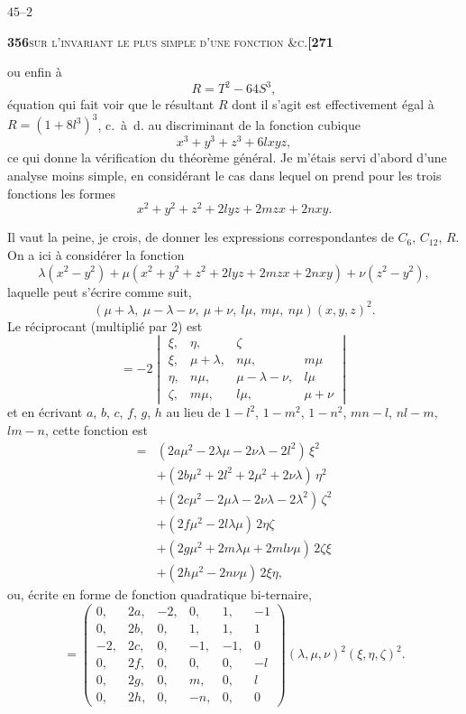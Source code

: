 \documentclass[11pt]{article}
\begin{document}
\hfill $45$--$2$

\newpage
\noindent\textbf{356}\hfill\textsc{sur l'invariant le plus simple d'une fonction \&c.}\hfill\textbf{[271}

\medskip

\noindent ou enfin \`a
\[
R = T^2 - 64 S^3,
\]
\'equation qui fait voir que le r\'esultant $R$ dont il s'agit est effectivement \'egal \`a $R = (1 + 8 l^3)^3$, c.~\`a~d. au discriminant de la fonction cubique
\[
x^3 + y^3 + z^3 + 6 l x y z,
\]
ce qui donne la v\'erification du th\'eor\`eme g\'en\'eral. Je m'\'etais servi d'abord d'une analyse moins simple, en consid\'erant le cas dans lequel on prend pour les trois fonctions les formes
\[
x^2 + y^2 + z^2 + 2 l y z + 2 m z x + 2 n x y.
\]

Il vaut la peine, je crois, de donner les expressions correspondantes de $C_6$, $C_{12}$, $R$. On a ici \`a consid\'erer la fonction
\[
\lambda(x^2 - y^2) + \mu(x^2 + y^2 + z^2 + 2 l y z + 2 m z x + 2 n x y) + \nu(z^2 - y^2),
\]
laquelle peut s'\'ecrire comme suit,
\[
(\mu + \lambda,\ \mu - \lambda - \nu,\ \mu + \nu,\ l\mu,\ m\mu,\ n\mu)(x, y, z)^2.
\]
Le r\'eciprocant (multipli\'e par 2) est
\[
= -2 \begin{vmatrix}
\xi, & \eta, & \zeta \\
\xi, & \mu+\lambda, & n\mu, & m\mu \\
\eta, & n\mu, & \mu-\lambda-\nu, & l\mu \\
\zeta, & m\mu, & l\mu, & \mu+\nu
\end{vmatrix}
\]
et en \'ecrivant $a$, $b$, $c$, $f$, $g$, $h$ au lieu de $1 - l^2$, $1 - m^2$, $1 - n^2$, $mn - l$, $nl - m$, $lm - n$, cette fonction est
\[
\begin{aligned}
= {}& (2 a \mu^2 - 2 \lambda \mu - 2 \nu \lambda - 2 l^2)\, \xi^2 \\
& + (2 b \mu^2 + 2 l^2 + 2 \mu^2 + 2 \nu \lambda)\, \eta^2 \\
& + (2 c \mu^2 - 2 \mu \lambda - 2 \nu \lambda - 2 \lambda^2)\, \zeta^2 \\
& + (2 f \mu^2 - 2 l \lambda \mu)\, 2 \eta \zeta \\
& + (2 g \mu^2 + 2 m \lambda \mu + 2 m l \nu \mu)\, 2 \zeta \xi \\
& + (2 h \mu^2 - 2 n \nu \mu)\, 2 \xi \eta,
\end{aligned}
\]
ou, \'ecrite en forme de fonction quadratique bi-ternaire,
\[
=\begin{pmatrix}
0, & 2a, & -2, & 0, & 1, & -1 \\
0, & 2b, & 0, & 1, & 1, & 1 \\
-2, & 2c, & 0, & -1, & -1, & 0 \\
0, & 2f, & 0, & 0, & 0, & -l \\
0, & 2g, & 0, & m, & 0, & l \\
0, & 2h, & 0, & -n, & 0, & 0
\end{pmatrix}(\lambda, \mu, \nu)^2 (\xi, \eta, \zeta)^2.
\]
\end{document}
